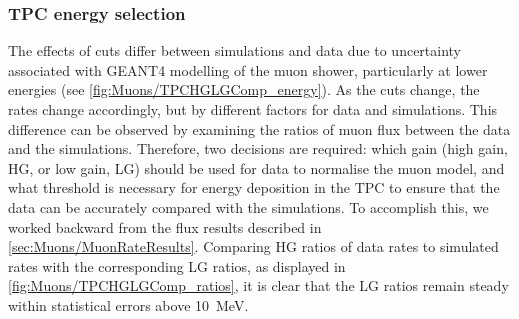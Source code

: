 \subsubsection{TPC energy selection}\label{sec:Muons/TPCEnergySelection}
The effects of cuts differ between simulations and data due to uncertainty associated with GEANT4 modelling of the muon shower, particularly at lower energies (see \autoref{fig:Muons/TPCHGLGComp_energy}). As the cuts change, the rates change accordingly, but by different factors for data and simulations. This difference can be observed by examining the ratios of muon flux between the data and the simulations. Therefore, two decisions are required: which gain (high gain, HG, or low gain, LG) should be used for data to normalise the muon model, and what threshold is necessary for energy deposition in the TPC to ensure that the data can be accurately compared with the simulations. To accomplish this, we worked backward from the flux results described in \autoref{sec:Muons/MuonRateResults}. Comparing HG ratios of data rates to simulated rates with the corresponding LG ratios, as displayed in \autoref{fig:Muons/TPCHGLGComp_ratios}, it is clear that the LG ratios remain steady within statistical errors above 10~MeV. 
